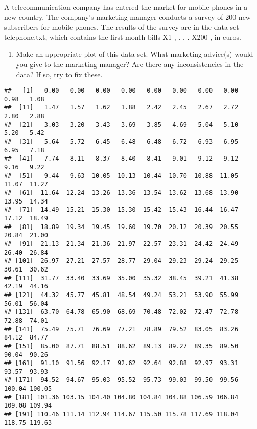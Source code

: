 \documentclass[
]{article}
\newenvironment{Shaded}{\begin{snugshade}}{\end{snugshade}}
\newcommand{\AttributeTok}[1]{\textcolor[rgb]{0.77,0.63,0.00}{#1}}
\newcommand{\CommentTok}[1]{\textcolor[rgb]{0.56,0.35,0.01}{\textit{#1}}}
\newcommand{\ConstantTok}[1]{\textcolor[rgb]{0.00,0.00,0.00}{#1}}
\newcommand{\FunctionTok}[1]{\textcolor[rgb]{0.00,0.00,0.00}{#1}}
\newcommand{\NormalTok}[1]{#1}
\newcommand{\OtherTok}[1]{\textcolor[rgb]{0.56,0.35,0.01}{#1}}
\newcommand{\SpecialCharTok}[1]{\textcolor[rgb]{0.00,0.00,0.00}{#1}}
\newcommand{\StringTok}[1]{\textcolor[rgb]{0.31,0.60,0.02}{#1}}
\providecommand{\tightlist}{%
  \setlength{\itemsep}{0pt}\setlength{\parskip}{0pt}}
\begin{document}
A telecommunication company has entered the market for mobile phones in
a new country. The company's marketing manager conducts a survey of 200
new subscribers for mobile phones. The results of the survey are in the
data set telephone.txt, which contains the first month bills X1 , . . .
X200 , in euros.

\begin{enumerate}
\def\labelenumi{\alph{enumi})}
\tightlist
\item
  Make an appropriate plot of this data set. What marketing advice(s)
  would you give to the marketing manager? Are there any inconsistencies
  in the data? If so, try to fix these.
\end{enumerate}

\begin{Shaded}
\end{Shaded}

\begin{verbatim}
##   [1]   0.00   0.00   0.00   0.00   0.00   0.00   0.00   0.00   0.98   1.08
##  [11]   1.47   1.57   1.62   1.88   2.42   2.45   2.67   2.72   2.80   2.88
##  [21]   3.03   3.20   3.43   3.69   3.85   4.69   5.04   5.10   5.20   5.42
##  [31]   5.64   5.72   6.45   6.48   6.48   6.72   6.93   6.95   6.95   7.18
##  [41]   7.74   8.11   8.37   8.40   8.41   9.01   9.12   9.12   9.16   9.22
##  [51]   9.44   9.63  10.05  10.13  10.44  10.70  10.88  11.05  11.07  11.27
##  [61]  11.64  12.24  13.26  13.36  13.54  13.62  13.68  13.90  13.95  14.34
##  [71]  14.49  15.21  15.30  15.30  15.42  15.43  16.44  16.47  17.12  18.49
##  [81]  18.89  19.34  19.45  19.60  19.70  20.12  20.39  20.55  20.84  21.00
##  [91]  21.13  21.34  21.36  21.97  22.57  23.31  24.42  24.49  26.40  26.84
## [101]  26.97  27.21  27.57  28.77  29.04  29.23  29.24  29.25  30.61  30.62
## [111]  31.77  33.40  33.69  35.00  35.32  38.45  39.21  41.38  42.19  44.16
## [121]  44.32  45.77  45.81  48.54  49.24  53.21  53.90  55.99  56.01  56.04
## [131]  63.70  64.78  65.90  68.69  70.48  72.02  72.47  72.78  72.88  74.01
## [141]  75.49  75.71  76.69  77.21  78.89  79.52  83.05  83.26  84.12  84.77
## [151]  85.00  87.71  88.51  88.62  89.13  89.27  89.35  89.50  90.04  90.26
## [161]  91.10  91.56  92.17  92.62  92.64  92.88  92.97  93.31  93.57  93.93
## [171]  94.52  94.67  95.03  95.52  95.73  99.03  99.50  99.56 100.04 100.05
## [181] 101.36 103.15 104.40 104.80 104.84 104.88 106.59 106.84 109.08 109.94
## [191] 110.46 111.14 112.94 114.67 115.50 115.78 117.69 118.04 118.75 119.63
\end{verbatim}
\end{document}
